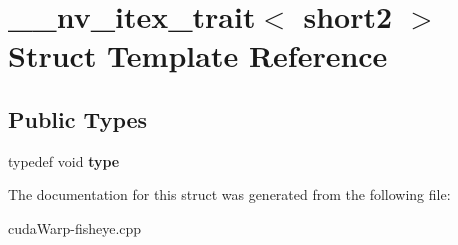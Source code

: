 \hypertarget{struct____nv__itex__trait_3_01short2_01_4}{}\section{\+\_\+\+\_\+nv\+\_\+itex\+\_\+trait$<$ short2 $>$ Struct Template Reference}
\label{struct____nv__itex__trait_3_01short2_01_4}
\subsection*{Public Types}
\begin{DoxyCompactItemize}
\item 
typedef void {\bfseries type}\hypertarget{struct____nv__itex__trait_3_01short2_01_4_a7665c0c5065045535917019b9163b28f}{}\label{struct____nv__itex__trait_3_01short2_01_4_a7665c0c5065045535917019b9163b28f}

\end{DoxyCompactItemize}


The documentation for this struct was generated from the following file\+:\begin{DoxyCompactItemize}
\item 
cuda\+Warp-\/fisheye.\+cpp\end{DoxyCompactItemize}
